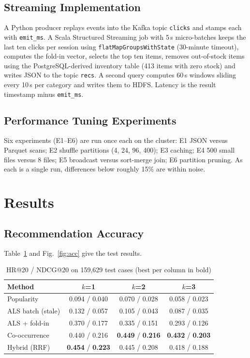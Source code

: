 \documentclass[10pt,journal]{IEEEtran}
\begin{document}
\subsection{Streaming Implementation}
A Python producer replays events into the Kafka topic \texttt{clicks} and stamps each with \texttt{emit\_ms}. A Scala Structured Streaming job with 5\,s micro-batches keeps the last ten clicks per session using \texttt{flatMapGroupsWithState} (30-minute timeout), computes the fold-in vector, selects the top ten items, removes out-of-stock items using the PostgreSQL-derived inventory table (413 items with zero stock) and writes JSON to the topic \texttt{recs}. A second query computes 60\,s windows sliding every 10\,s per category and writes them to HDFS. Latency is the result timestamp minus \texttt{emit\_ms}.

\subsection{Performance Tuning Experiments}
Six experiments (E1--E6) are run once each on the cluster: E1 JSON versus Parquet scans; E2 shuffle partitions (4, 24, 96, 400); E3 caching; E4 500 small files versus 8 files; E5 broadcast versus sort-merge join; E6 partition pruning. As each is a single run, differences below roughly 15\% are within noise.

\section{Results}
\subsection{Recommendation Accuracy}
Table~\ref{tab:results} and Fig.~\ref{fig:acc} give the test results.

\begin{table}[!t]
\caption{HR@20 / NDCG@20 on 159{,}629 test cases (best per column in bold)}
\label{tab:results}
\centering
\footnotesize
\begin{tabular}{@{}lccc@{}}
\hline
\textbf{Method} & \textbf{$k$=1} & \textbf{$k$=2} & \textbf{$k$=3}\\\hline
Popularity & 0.094 / 0.040 & 0.070 / 0.028 & 0.058 / 0.023\\
ALS batch (stale) & 0.132 / 0.057 & 0.105 / 0.043 & 0.087 / 0.035\\
ALS + fold-in & 0.370 / 0.177 & 0.335 / 0.151 & 0.293 / 0.126\\
Co-occurrence & 0.440 / 0.216 & \textbf{0.449} / \textbf{0.216} & \textbf{0.432} / \textbf{0.203}\\
Hybrid (RRF) & \textbf{0.454} / \textbf{0.223} & 0.445 / 0.208 & 0.418 / 0.188\\\hline
\end{tabular}
\end{table}
\end{document}
